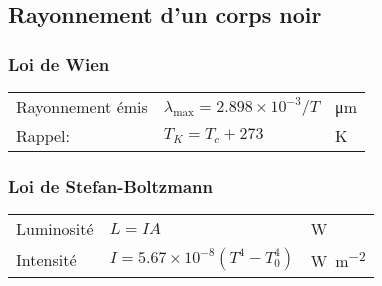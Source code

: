 \subsection{Rayonnement d'un corps noir}
\subsubsection{Loi de Wien}
\begin{tabular}{lll}
    Rayonnement émis &  \(\lambda_{\text{max}}=2.898\times 10^{-3}/T\) & \si{\micro\meter}\\
    \hfill Rappel: & \(T_K=T_c+273\) & \si{\kelvin}
\end{tabular}

\subsubsection{Loi de Stefan-Boltzmann}
\begin{tabular}{lll}
    Luminosité & \(L=IA\) & \si{\watt}\\
    Intensité & \(I= 5.67\times10^{-8} (T^4-T_0^4)\) & \si{\watt\per\meter\squared}
\end{tabular}